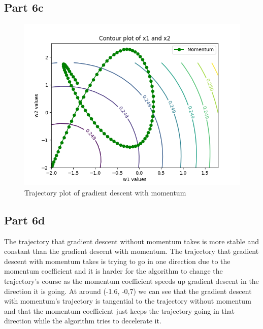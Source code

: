 \documentclass[10pt,letterpaper]{article}
\begin{document}
	\subsection*{Part 6c}
	\begin{figure}[H]
		\centering
		\includegraphics[width=\linewidth]{part6_contour_plot_with_trajectory-099momentum}
		\caption{Trajectory plot of gradient descent with momentum}
		\label{fig:part6contourplotwithtrajectory-099momentum}
	\end{figure}
	\subsection*{Part 6d}
    The trajectory that gradient descent without momentum takes is more stable and constant than the gradient descent with momentum. The trajectory that gradient descent with momentum takes is trying to go in one direction due to the momentum coefficient and it is harder for the algorithm to change the trajectory's course as the momentum coefficient speeds up gradient descent in the direction it is going. At around (-1.6, -0,7) we can see that the gradient descent with momentum's trajectory is tangential to the trajectory without momentum and that the momentum coefficient just keeps the trajectory going in that direction while the algorithm tries to decelerate it.
\end{document}
